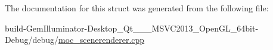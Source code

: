 The documentation for this struct was generated from the following file\+:\begin{DoxyCompactItemize}
\item 
build-\/\+Gem\+Illuminator-\/\+Desktop\+\_\+\+Qt\+\_\+\_\+\_\+\+M\+S\+V\+C2013\+\_\+\+Open\+G\+L\+\_\+64bit-\/\+Debug/debug/\hyperlink{moc__scenerenderer_8cpp}{moc\+\_\+scenerenderer.\+cpp}\end{DoxyCompactItemize}
